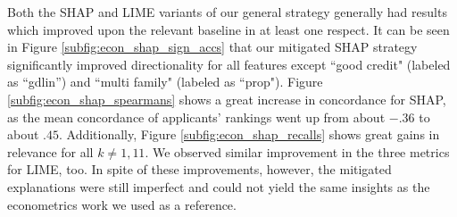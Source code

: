 \documentclass[12pt]{article}  %
\begin{document}
  Both the SHAP and LIME variants of our general strategy generally had results which improved upon the relevant baseline in at least one respect.%
It can be seen in Figure \ref{subfig:econ_shap_sign_accs} that our mitigated SHAP strategy significantly improved directionality for all features except ``good credit" (labeled as ``gdlin'') and ``multi family" (labeled as ``prop"). Figure \ref{subfig:econ_shap_spearmans} shows a great increase in concordance for SHAP, as the mean concordance of applicants' rankings went up from about $-.36$ to about $.45$. Additionally, Figure \ref{subfig:econ_shap_recalls} shows great gains in relevance for all $k\neq 1,11$. We observed similar improvement in the three metrics for LIME, too. %
In spite of these improvements, however, the mitigated explanations were still imperfect and could not yield the same insights as the econometrics work we used as a reference.
  
\end{document}
